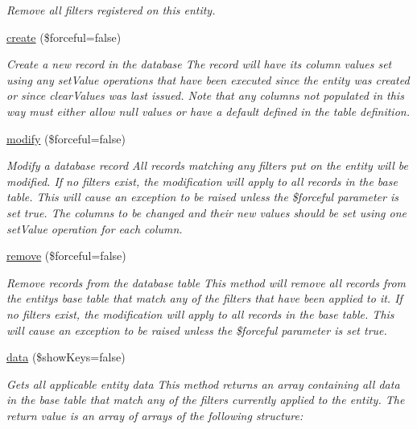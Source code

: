 \begin{DoxyCompactItemize}
\begin{DoxyCompactList}\small\item\em Remove all filters registered on this entity. \end{DoxyCompactList}\item 
\hypertarget{classentity_aa093f16b8fa83dcba92779df20f8a53f}{}\hyperlink{classentity_aa093f16b8fa83dcba92779df20f8a53f}{create} (\$forceful=false)\label{classentity_aa093f16b8fa83dcba92779df20f8a53f}

\begin{DoxyCompactList}\small\item\em Create a new record in the database The record will have its column values set using any set\+Value operations that have been executed since the entity was created or since clear\+Values was last issued. Note that any columns not populated in this way must either allow null values or have a default defined in the table definition. \end{DoxyCompactList}\item 
\hyperlink{classentity_a93f973ae16957a93f792003a89a13be0}{modify} (\$forceful=false)
\begin{DoxyCompactList}\small\item\em Modify a database record All records matching any filters put on the entity will be modified. If no filters exist, the modification will apply to all records in the base table. This will cause an exception to be raised unless the \$forceful parameter is set true. The columns to be changed and their new values should be set using one set\+Value operation for each column. \end{DoxyCompactList}\item 
\hyperlink{classentity_a67aada7aaf1810524e8ae93992f2900c}{remove} (\$forceful=false)
\begin{DoxyCompactList}\small\item\em Remove records from the database table This method will remove all records from the entity\textquotesingle{}s base table that match any of the filters that have been applied to it. If no filters exist, the modification will apply to all records in the base table. This will cause an exception to be raised unless the \$forceful parameter is set true. \end{DoxyCompactList}\item 
\hyperlink{classentity_adfb66dcc511ef54670c2999d9f716eb9}{data} (\$show\+Keys=false)
\begin{DoxyCompactList}\small\item\em Gets all applicable entity data This method returns an array containing all data in the base table that match any of the filters currently applied to the entity. The return value is an array of arrays of the following structure\+: \end{DoxyCompactList}\item 

\end{DoxyCompactItemize}
